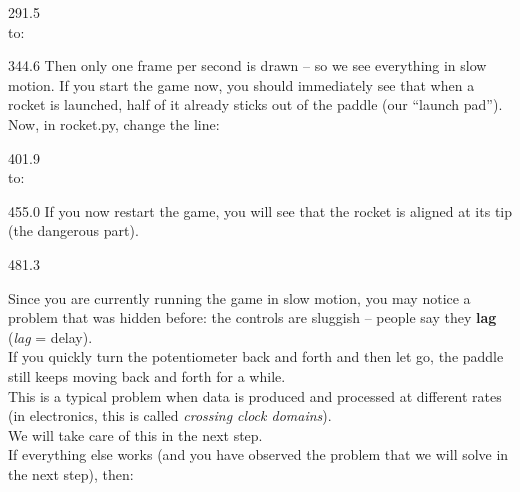 \documentclass{aslab}
\begin{document}
\begin{region}[x=74.7,right=0,pitch=17.7]{291.5}
\\
to:\\
\end{region}

\begin{region}[x=74.7,right=0,pitch=13.17]{344.6}
Then only one frame per second is drawn -- so we see everything in slow
motion. If you start the game now, you should immediately see that when a
rocket is launched, half of it already sticks out of the paddle (our
``launch pad'').\\
Now, in rocket.py, change the line:
\end{region}

\begin{region}[x=74.7,right=0,pitch=17.75]{401.9}
\\
to:\\
\end{region}

\begin{region}[x=74.7,right=0,pitch=13.2]{455.0}
If you now restart the game, you will see that the rocket is aligned at its
tip (the dangerous part).
\end{region}

\begin{region}[pitch=13.45]{481.3}
\begin{tasks}[start=3]
\item Since you are currently running the game in slow motion, you may
  notice a problem that was hidden before: the controls are sluggish --
  people say they \textbf{lag} (\textit{lag} = delay).\\
  If you quickly turn the potentiometer back and forth and then let go, the
  paddle still keeps moving back and forth for a while.\\
  This is a typical problem when data is produced and processed at different
  rates (in electronics, this is called \textit{crossing clock domains}).\\
  We will take care of this in the next step.\\
  If everything else works (and you have observed the problem that we will
  solve in the next step), then:\\
  \\
\end{tasks}
\end{region}
\end{document}
